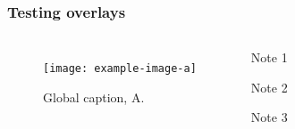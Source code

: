 \documentclass{beamer}
\begin{document}
	\begin{frame}
		\frametitle{Testing overlays}
		 \begin{columns}

				\begin{figure}
					\texttt{[image: example-image-a]}
					\caption{Global caption, A.}
				\end{figure}



				\begin{enumerate}
					 {\item<1>[1.] Note 1}
					 {\item<2>[2.] Note 2}
					 {\item<3>[3.] Note 3}
				\end{enumerate}

		\end{columns}
	\end{frame}
\end{document}
